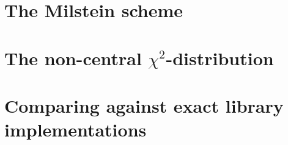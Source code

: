 \documentclass[11pt,a4paper,oneside,english]{extarticle}
\begin{document}
\section{The Milstein scheme}

\section{The non-central $ \chi^2 $-distribution}

\section{Comparing against exact library implementations}
\end{document}
